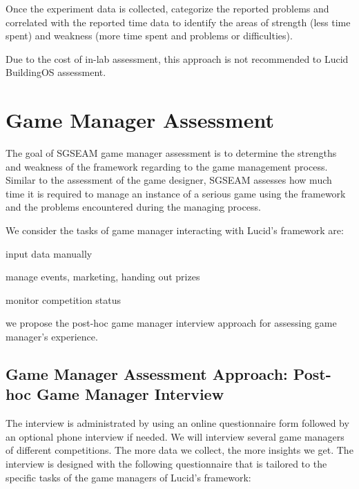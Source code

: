 \documentclass[11pt,oneside]{book}
\begin{document}
Once the experiment data is collected, categorize the reported problems and correlated with the reported time data 
to identify the areas of strength (less time spent) and weakness (more time spent and problems or difficulties). 

Due to the cost of in-lab assessment, this approach is not recommended to Lucid BuildingOS assessment.

\section{Game Manager Assessment}

The goal of SGSEAM game manager assessment is to determine the strengths and weakness of the framework 
regarding to the game management process. Similar to the assessment of the game designer, SGSEAM assesses 
how much time it is required to manage an instance of a serious game using the framework
and the problems encountered during the managing process.

We consider the tasks of game manager interacting with Lucid's framework are:
\begin{compactenum}
    \item input data manually
    \item manage events, marketing, handing out prizes
    \item monitor competition status
\end{compactenum}

we propose the post-hoc game manager interview approach for assessing game manager's experience.
    
\subsection{Game Manager Assessment Approach: Post-hoc Game Manager Interview}
\label{Post-hoc game manager interview}

 The interview is administrated by using an online questionnaire form followed by an optional phone interview if needed. We will interview several game managers of different competitions. The more data we collect, the more insights we get.  The interview is designed with the following questionnaire that is tailored to the specific tasks of the game managers of Lucid's framework:
\end{document}
